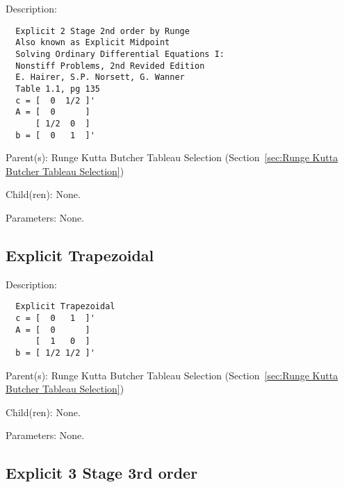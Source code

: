 \begin{list}{}
  {\setlength{\leftmargin}{1.0in}
   \setlength{\labelwidth}{0.75in}
   \setlength{\labelsep}{0.125in}}
  \item[Description:]
\begin{verbatim}
  Explicit 2 Stage 2nd order by Runge
  Also known as Explicit Midpoint
  Solving Ordinary Differential Equations I:
  Nonstiff Problems, 2nd Revided Edition
  E. Hairer, S.P. Norsett, G. Wanner
  Table 1.1, pg 135
  c = [  0  1/2 ]'
  A = [  0      ]
      [ 1/2  0  ]
  b = [  0   1  ]'
\end{verbatim}
  \item[Parent(s):]
    Runge Kutta Butcher Tableau Selection (Section~\ref{sec:Runge Kutta Butcher Tableau Selection})
  \item[Child(ren):]
    None. 
  \item[Parameters:]
    None. 
\end{list}

\subsection{Explicit Trapezoidal}
\label{sec:Explicit Trapezoidal}

\begin{list}{}
  {\setlength{\leftmargin}{1.0in}
   \setlength{\labelwidth}{0.75in}
   \setlength{\labelsep}{0.125in}}
  \item[Description:]
\begin{verbatim}
  Explicit Trapezoidal
  c = [  0   1  ]'
  A = [  0      ]
      [  1   0  ]
  b = [ 1/2 1/2 ]'
\end{verbatim}
  \item[Parent(s):]
    Runge Kutta Butcher Tableau Selection (Section~\ref{sec:Runge Kutta Butcher Tableau Selection})
  \item[Child(ren):]
    None. 
  \item[Parameters:]
    None. 
\end{list}

\subsection{Explicit 3 Stage 3rd order}
\label{sec:Explicit 3 Stage 3rd order}

